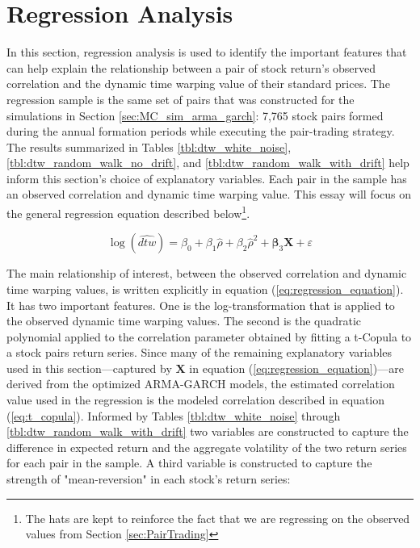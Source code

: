 \documentclass[12pt]{report}
\begin{document}
\chapter{Regression Analysis} \label{sec:Regression_Analysis}

In this section, regression analysis is used to identify the important features that can help explain the relationship between a pair of stock return's observed correlation and the dynamic time warping value of their standard prices. The regression sample is the same set of pairs that was constructed for the simulations in Section \ref{sec:MC_sim_arma_garch}: 7,765 stock pairs formed during the annual formation periods while executing the pair-trading strategy. The results summarized in Tables \ref{tbl:dtw_white_noise}, \ref{tbl:dtw_random_walk_no_drift}, and \ref{tbl:dtw_random_walk_with_drift} help inform this section's choice of explanatory variables. Each pair in the sample has an observed correlation and dynamic time warping value. This essay will focus on the general regression equation described below\footnote{The hats are kept to reinforce the fact that we are regressing on the observed values from Section \ref{sec:PairTrading}}.

\begin{equation} \label{eq:regression_equation}
    \log(\widehat{dtw}) = \beta_{0} + \beta_{1} \hat{\rho} + \beta_{2} \hat{\rho}^{2} + \boldsymbol{\beta}_{3} \boldsymbol{X} + \varepsilon
\end{equation}

The main relationship of interest, between the observed correlation and dynamic time warping values, is written explicitly in equation (\ref{eq:regression_equation}). It has two important features. One is the log-transformation that is applied to the observed dynamic time warping values. The second is the quadratic polynomial applied to the correlation parameter obtained by fitting a t-Copula to a stock pairs return series. Since many of the remaining explanatory variables used in this section---captured by $\boldsymbol{X}$ in equation (\ref{eq:regression_equation})---are derived from the optimized ARMA-GARCH models, the estimated correlation value used in the regression is the modeled correlation described in equation (\ref{eq:t_copula}). Informed by Tables \ref{tbl:dtw_white_noise} through \ref{tbl:dtw_random_walk_with_drift} two variables are constructed to capture the difference in expected return and the aggregate volatility of the two return series for each pair in the sample. A third variable is constructed to capture the strength of "mean-reversion" in each stock's return series:
\end{document}
